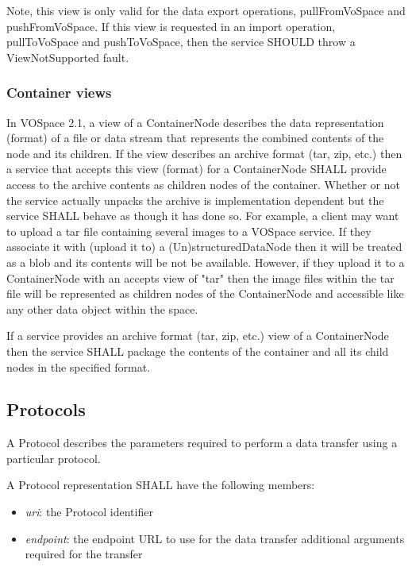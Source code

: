 \documentclass[11pt,a4paper]{ivoa}
\begin{document}
Note, this view is only valid for the data export operations, pullFromVoSpace and pushFromVoSpace. If this view is requested in an import operation, pullToVoSpace and pushToVoSpace, then the service SHOULD throw a ViewNotSupported fault.

\subsubsection{Container views}
\label{subsubsec:container views}
In VOSpace 2.1, a view of a ContainerNode describes the data representation (format) of a file or data stream that represents the combined contents of the node and its children. If the view describes an archive format (tar, zip, etc.) then a service that accepts this view (format) for a ContainerNode SHALL provide access to the archive contents as children nodes of the container. Whether or not the service actually unpacks the archive is implementation dependent but the service SHALL behave as though it has done so. For example, a client may want to upload a tar file containing several images to a VOSpace service. If they associate it with (upload it to) a (Un)structuredDataNode then it will be treated as a blob and its contents will be not be available. However, if they upload it to a ContainerNode with an accepts view of "tar" then the image files within the tar file will be represented as children nodes of the ContainerNode and accessible like any other data object within the space.

If a service provides an archive format (tar, zip, etc.) view of a ContainerNode then the service SHALL package the contents of the container and all its child nodes in the specified format.

\subsection{Protocols}
\label{subsec:protocols}
A Protocol describes the parameters required to perform a data transfer using a particular protocol.

A Protocol representation SHALL have the following members:

\begin{itemize}
    \item \emph{uri}: the Protocol identifier
    \item \emph{endpoint}: the endpoint URL to use for the data transfer additional arguments required for the transfer
\end{itemize}
\end{document}
